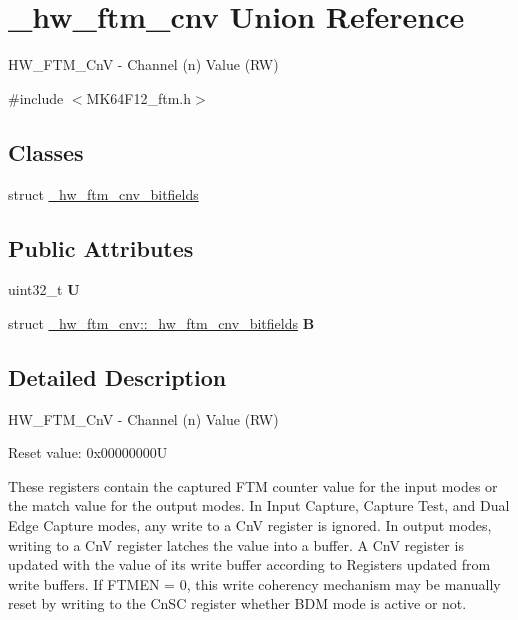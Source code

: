 \hypertarget{union__hw__ftm__cnv}{}\section{\+\_\+hw\+\_\+ftm\+\_\+cnv Union Reference}
\label{union__hw__ftm__cnv}


H\+W\+\_\+\+F\+T\+M\+\_\+\+CnV -\/ Channel (n) Value (RW)  




{\ttfamily \#include $<$M\+K64\+F12\+\_\+ftm.\+h$>$}

\subsection*{Classes}
\begin{DoxyCompactItemize}
\item 
struct \hyperlink{struct__hw__ftm__cnv_1_1__hw__ftm__cnv__bitfields}{\+\_\+hw\+\_\+ftm\+\_\+cnv\+\_\+bitfields}
\end{DoxyCompactItemize}
\subsection*{Public Attributes}
\begin{DoxyCompactItemize}
\item 
uint32\+\_\+t {\bfseries U}\hypertarget{union__hw__ftm__cnv_a359d0a40cb9756e938386cd374f2b95b}{}\label{union__hw__ftm__cnv_a359d0a40cb9756e938386cd374f2b95b}

\item 
struct \hyperlink{struct__hw__ftm__cnv_1_1__hw__ftm__cnv__bitfields}{\+\_\+hw\+\_\+ftm\+\_\+cnv\+::\+\_\+hw\+\_\+ftm\+\_\+cnv\+\_\+bitfields} {\bfseries B}\hypertarget{union__hw__ftm__cnv_addd140970007f8dd1d2001b846707f52}{}\label{union__hw__ftm__cnv_addd140970007f8dd1d2001b846707f52}

\end{DoxyCompactItemize}


\subsection{Detailed Description}
H\+W\+\_\+\+F\+T\+M\+\_\+\+CnV -\/ Channel (n) Value (RW) 

Reset value\+: 0x00000000U

These registers contain the captured F\+TM counter value for the input modes or the match value for the output modes. In Input Capture, Capture Test, and Dual Edge Capture modes, any write to a CnV register is ignored. In output modes, writing to a CnV register latches the value into a buffer. A CnV register is updated with the value of its write buffer according to Registers updated from write buffers. If F\+T\+M\+EN = 0, this write coherency mechanism may be manually reset by writing to the Cn\+SC register whether B\+DM mode is active or not. 

